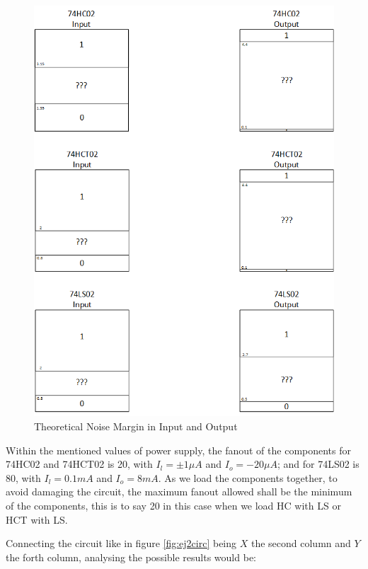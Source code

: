 	 \begin{figure}[h!]
        \centering
        \includegraphics[scale=0.5]{../Exercise2/dataaa2.png}
        \caption{\color{cyan}Theoretical Noise Margin in Input and Output}
        \label{fig:ej2thnm}
    \end{figure}
    
    Within the mentioned values of power supply, the fanout of the components for 74HC02 and 74HCT02 is 20, with $I_l =\pm1{\mu}A$ and $I_o=-20{\mu}A$; and for 74LS02 is 80, with $I_l =0.1mA$ and $I_o=8mA$. As we load the components together, to avoid damaging the circuit, the maximum fanout allowed shall be the minimum of the components, this is to say 20 in this case when we load HC with LS or HCT with LS. 
    
    Connecting the circuit like in figure \ref{fig:ej2circ} being $X$ the second column and $Y$ the forth column, analysing the possible results would be:

